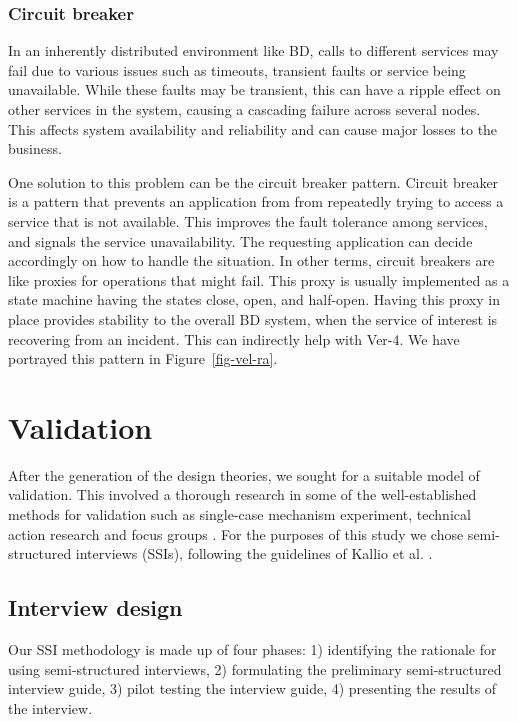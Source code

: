 \documentclass{bmcart}
\begin{document}
\subsubsection{Circuit breaker}
 
In an inherently distributed environment like BD, calls to different services may fail due to various issues such as timeouts, transient faults or service being unavailable. While these faults may be transient, this can have a ripple effect on other services in the system, causing a cascading failure across several nodes. This affects system availability and reliability and can cause major losses to the business. 

One solution to this problem can be the circuit breaker pattern. Circuit breaker is a pattern that prevents an application from from repeatedly trying to access a service that is not available. This improves the fault tolerance among services, and signals the service unavailability. The requesting application can decide accordingly on how to handle the situation. In other terms, circuit breakers are like proxies for operations that might fail. This proxy is usually implemented as a state machine having the states close, open, and half-open. Having this proxy in place provides stability to the overall BD system, when the service of interest is recovering from an incident. This can indirectly help with Ver-4. We have portrayed this pattern in Figure~\ref{fig-vel-ra}.



\section{Validation}

After the generation of the design theories, we sought for a suitable model of validation. This involved a thorough research in some of the well-established methods for validation such as single-case mechanism experiment, technical action research and focus groups \cite{wieringa2014design}. For the purposes of this study we chose semi-structured interviews (SSIs), following the guidelines of Kallio et al. \cite{kallio2016systematic}. 



\subsection{Interview design}
Our SSI methodology is made up of four phases: 1) identifying the rationale for using semi-structured interviews, 2) formulating the preliminary semi-structured interview guide, 3) pilot testing the interview guide, 4) presenting the results of the interview. 
\end{document}
